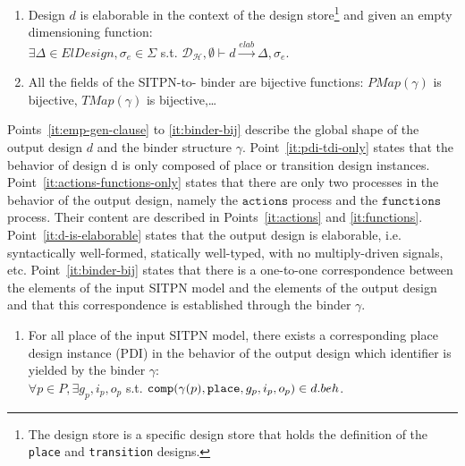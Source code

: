 \begin{definition}
\begin{enumerate}
  \item\label{it:d-is-elaborable} Design $d$ is elaborable in the context of the \hilecop{} design store\footnote{The \hilecop{} design store is a specific design store that holds the definition of the \texttt{place} and \texttt{transition} designs.} and given an empty dimensioning function:\\
    $\exists{}\Delta\in{}ElDesign,\sigma_e\in\Sigma$ s.t.
    $\mathcal{D_\mathcal{H}},\emptyset\vdash{}d\xrightarrow{elab}\Delta,\sigma_e$.
    
  \item\label{it:binder-bij} All the fields of the SITPN-to-\hvhdl{} binder are bijective
    functions: $PMap(\gamma)$ is bijective, $TMap(\gamma)$ is
    bijective,\dots
  \end{enumerate}

  \bigskip
  
  Points~\ref{it:emp-gen-clause} to \ref{it:binder-bij} describe the
  global shape of the output design $d$ and the binder structure
  $\gamma$.  Point~\ref{it:pdi-tdi-only} states that the behavior of
  design d is only composed of place or transition design
  instances. Point~\ref{it:actions-functions-only} states that there
  are only two processes in the behavior of the output design, namely
  the $\mathtt{actions}$ process and the $\mathtt{functions}$
  process. Their content are described in Points~\ref{it:actions} and
  \ref{it:functions}. Point~\ref{it:d-is-elaborable} states that the
  output design is elaborable, i.e. syntactically well-formed,
  statically well-typed, with no multiply-driven signals, etc.
  Point~\ref{it:binder-bij} states that there is a one-to-one
  correspondence between the elements of the input SITPN model and the
  elements of the output design and that this correspondence is
  established through the binder $\gamma$.

  \bigskip
  
  \begin{enumerate}[resume]
  \item\label{it:pdi-exists} For all place of the input SITPN model,
    there exists a corresponding place design instance (PDI) in the
    behavior of the output \hvhdl{} design which identifier is yielded
    by the binder $\gamma$:\\
    $\forall{}p\in{}P,\exists{}g_p,i_p,o_p$ s.t.  $\mathtt{comp}(\gamma(p),\mathtt{place},g_p,i_p,o_p)\in{}d.beh$.
    

\end{enumerate}
\end{definition}
